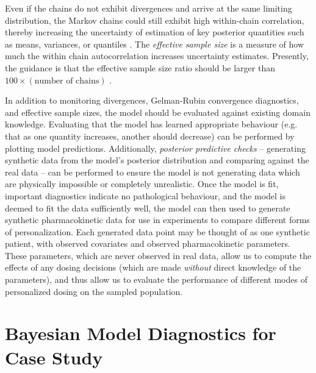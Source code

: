 Even if the chains do not exhibit divergences and arrive at the same limiting distribution, the Markov chains could still exhibit high within-chain correlation, thereby increasing the uncertainty of estimation of key posterior quantities such as means, variances, or quantiles \cite{brooks2011handbook}.  The \textit{effective sample size} is a measure of how much the within chain autocorrelation increases uncertainty estimates.  Presently, the guidance is that the effective sample size ratio should be larger than $100 \times (\mbox{number of chains})$ \cite{vehtari2019rank}.

In addition to monitoring divergences, Gelman-Rubin convergence diagnostics, and effective sample sizes, the model should be evaluated against existing domain knowledge.  Evaluating that the model has learned appropriate  behaviour (e.g. that as one quantity increases, another should decrease) can be performed by plotting model predictions.  Additionally, \textit{posterior predictive checks} -- generating synthetic data  from the model's posterior distribution and comparing against the real data -- can be performed to ensure the model is not generating data which are physically impossible or completely unrealistic. Once the model is fit, important diagnostics indicate no pathological behaviour, and the model is deemed to fit the data sufficiently well, the model can then used to generate synthetic pharmacokinetic data for use in experiments to compare different forms of personalization. Each generated data point may be thought of as one synthetic patient, with observed covariates and observed pharmacokinetic parameters. These parameters, which are never observed in real data, allow us to compute the effects of any dosing decisions (which are made \textit{without} direct knowledge of the parameters), and thus allow us to evaluate the performance of different modes of personalized dosing on the sampled population. 

\section{Bayesian Model Diagnostics for Case Study}

